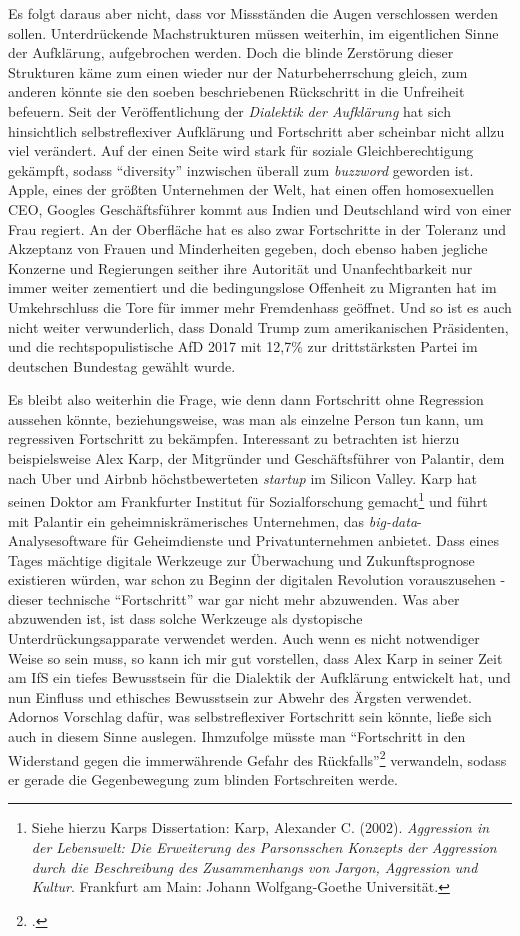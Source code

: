 \documentclass[a4paper, 12pt]{article}
\begin{document}
\begin{onehalfspace}
Es folgt daraus aber nicht, dass vor Missständen die Augen verschlossen werden sollen. Unterdrückende Machstrukturen müssen weiterhin, im eigentlichen Sinne der Aufklärung, aufgebrochen werden. Doch die blinde Zerstörung dieser Strukturen käme zum einen wieder nur der Naturbeherrschung gleich, zum anderen könnte sie den soeben beschriebenen Rückschritt in die Unfreiheit befeuern. Seit der Veröffentlichung der \emph{Dialektik der Aufklärung} hat sich hinsichtlich selbstreflexiver Aufklärung und Fortschritt aber scheinbar nicht allzu viel verändert. Auf der einen Seite wird stark für soziale Gleichberechtigung gekämpft, sodass "`diversity"' inzwischen überall zum \emph{buzzword} geworden ist. Apple, eines der größten Unternehmen der Welt, hat einen offen homosexuellen CEO, Googles Geschäftsführer kommt aus Indien und Deutschland wird von einer Frau regiert. An der Oberfläche hat es also zwar Fortschritte in der Toleranz und Akzeptanz von Frauen und Minderheiten gegeben, doch ebenso haben jegliche Konzerne und Regierungen seither ihre Autorität und Unanfechtbarkeit nur immer weiter zementiert und die bedingungslose Offenheit zu Migranten hat im Umkehrschluss die Tore für immer mehr Fremdenhass geöffnet. Und so ist es auch nicht weiter verwunderlich, dass Donald Trump zum amerikanischen Präsidenten, und die rechtspopulistische AfD 2017 mit 12,7\% zur drittstärksten Partei im deutschen Bundestag gewählt wurde. 

Es bleibt also weiterhin die Frage, wie denn dann Fortschritt ohne Regression aussehen könnte, beziehungsweise, was man als einzelne Person tun kann, um regressiven Fortschritt zu bekämpfen. Interessant zu betrachten ist hierzu beispielsweise Alex Karp, der Mitgründer und Geschäftsführer von Palantir, dem nach Uber und Airbnb höchstbewerteten \emph{startup} im Silicon Valley. Karp hat seinen Doktor am Frankfurter Institut für Sozialforschung gemacht\footnote{Siehe hierzu Karps Dissertation: Karp, Alexander C. (2002). \emph{Aggression in der Lebenswelt: Die Erweiterung des Parsonsschen Konzepts der Aggression durch die Beschreibung des Zusammenhangs von Jargon, Aggression und Kultur}. Frankfurt am Main: Johann Wolfgang-Goethe Universität.} und führt mit Palantir ein geheimniskrämerisches Unternehmen, das \emph{big-data}-Analysesoftware für Geheimdienste und Privatunternehmen anbietet. Dass eines Tages mächtige digitale Werkzeuge zur Überwachung und Zukunftsprognose existieren würden, war schon zu Beginn der digitalen Revolution vorauszusehen - dieser technische "`Fortschritt"' war gar nicht mehr abzuwenden. Was aber abzuwenden ist, ist dass solche Werkzeuge als dystopische Unterdrückungsapparate verwendet werden. Auch wenn es nicht notwendiger Weise so sein muss, so kann ich mir gut vorstellen, dass Alex Karp in seiner Zeit am IfS ein tiefes Bewusstsein für die Dialektik der Aufklärung entwickelt hat, und nun Einfluss und ethisches Bewusstsein zur Abwehr des Ärgsten verwendet. Adornos Vorschlag dafür, was selbstreflexiver Fortschritt sein könnte, ließe sich auch in diesem Sinne auslegen. Ihmzufolge müsste man "`Fortschritt in den Widerstand gegen die immerwährende Gefahr des Rückfalls"'\footnote{\Cite[Siehe][S. 638]{fortschritt}.} verwandeln, sodass er gerade die Gegenbewegung zum blinden Fortschreiten werde. 


\end{onehalfspace}
\end{document}

